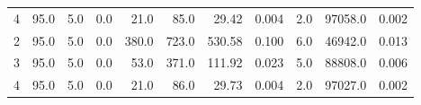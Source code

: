 \begin{tabular}{lrrrrrrrrrr}
4 &                95.0 &                 5.0 &                  0.0 &          21.0 &          85.0 &         29.42 &                                         0.004 &                      2.0 &                     97058.0 &                         0.002 \\
2 &                95.0 &                 5.0 &                  0.0 &         380.0 &         723.0 &        530.58 &                                         0.100 &                      6.0 &                     46942.0 &                         0.013 \\
3 &                95.0 &                 5.0 &                  0.0 &          53.0 &         371.0 &        111.92 &                                         0.023 &                      5.0 &                     88808.0 &                         0.006 \\
4 &                95.0 &                 5.0 &                  0.0 &          21.0 &          86.0 &         29.73 &                                         0.004 &                      2.0 &                     97027.0 &                         0.002 \\
\bottomrule
\end{tabular}
